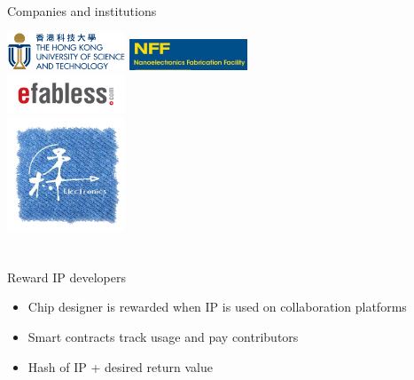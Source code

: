 \documentclass[9pt]{beamer}
\begin{document}
\begin{frame}{Companies and institutions}
	\begin{center}
		\includegraphics[width=100pt]{HKUST_Logo.png}
		\includegraphics[width=100pt]{NFF.jpg}  \\
		\includegraphics[width=100pt]{efabless_logo.png} \\
		\includegraphics[width=100pt]{Lanceville.png}
	\end{center}
\end{frame}

\section[How]{}
\begin{frame}{Reward IP developers}
	\begin{itemize}
        \setlength\itemsep{1em}
		\item Chip designer is rewarded when IP is used on collaboration platforms
		\item Smart contracts track usage and pay contributors
		\item Hash of IP + desired return value
	\end{itemize}
\end{frame}
\end{document}
